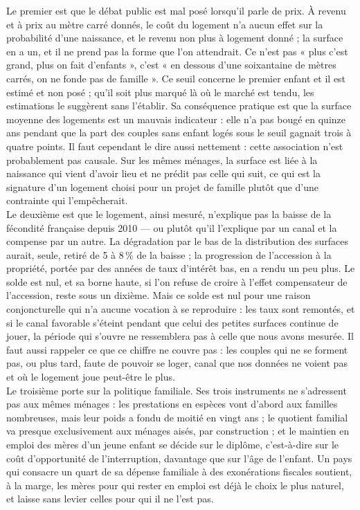 \documentclass[12pt,a4paper]{article}
\begin{document}
\noindent Le premier est que le débat public est mal posé lorsqu'il parle de prix. À revenu et à prix au mètre carré donnés, le coût du logement n'a aucun effet sur la probabilité d'une naissance, et le revenu non plus à logement donné ; la surface en a un, et il ne prend pas la forme que l'on attendrait. Ce n'est pas « plus c'est grand, plus on fait d'enfants », c'est « en dessous d'une soixantaine de mètres carrés, on ne fonde pas de famille ». Ce seuil concerne le premier enfant et il est estimé et non posé ; qu'il soit plus marqué là où le marché est tendu, les estimations le suggèrent sans l'établir. Sa conséquence pratique est que la surface moyenne des logements est un mauvais indicateur : elle n'a pas bougé en quinze ans pendant que la part des couples sans enfant logés sous le seuil gagnait trois à quatre points. Il faut cependant le dire aussi nettement : cette association n'est probablement pas causale. Sur les mêmes ménages, la surface est liée à la naissance qui vient d'avoir lieu et ne prédit pas celle qui suit, ce qui est la signature d'un logement choisi pour un projet de famille plutôt que d'une contrainte qui l'empêcherait. \\

\noindent Le deuxième est que le logement, ainsi mesuré, n'explique pas la baisse de la fécondité française depuis 2010 — ou plutôt qu'il l'explique par un canal et la compense par un autre. La dégradation par le bas de la distribution des surfaces aurait, seule, retiré de 5 à 8\,\% de la baisse ; la progression de l'accession à la propriété, portée par des années de taux d'intérêt bas, en a rendu un peu plus. Le solde est nul, et sa borne haute, si l'on refuse de croire à l'effet compensateur de l'accession, reste sous un dixième. Mais ce solde est nul pour une raison conjoncturelle qui n'a aucune vocation à se reproduire : les taux sont remontés, et si le canal favorable s'éteint pendant que celui des petites surfaces continue de jouer, la période qui s'ouvre ne ressemblera pas à celle que nous avons mesurée. Il faut aussi rappeler ce que ce chiffre ne couvre pas : les couples qui ne se forment pas, ou plus tard, faute de pouvoir se loger, canal que nos données ne voient pas et où le logement joue peut-être le plus. \\

\noindent Le troisième porte sur la politique familiale. Ses trois instruments ne s'adressent pas aux mêmes ménages : les prestations en espèces vont d'abord aux familles nombreuses, mais leur poids a fondu de moitié en vingt ans ; le quotient familial va presque exclusivement aux ménages aisés, par construction ; et le maintien en emploi des mères d'un jeune enfant se décide sur le diplôme, c'est-à-dire sur le coût d'opportunité de l'interruption, davantage que sur l'âge de l'enfant. Un pays qui consacre un quart de sa dépense familiale à des exonérations fiscales soutient, à la marge, les mères pour qui rester en emploi est déjà le choix le plus naturel, et laisse sans levier celles pour qui il ne l'est pas. \\
\end{document}
